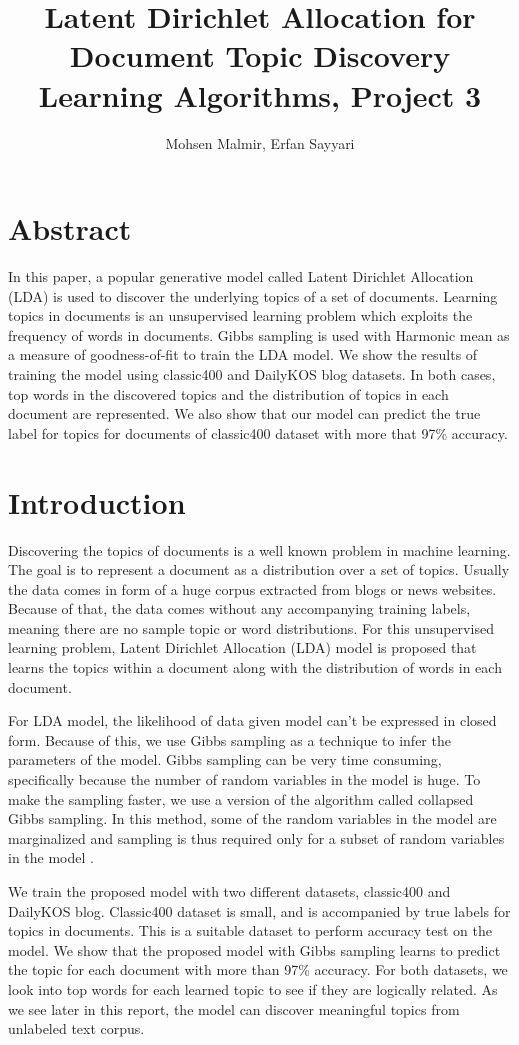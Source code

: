 \documentclass[twoside,12pt]{article}
\begin{document}
\title{Latent Dirichlet Allocation for Document Topic Discovery\\  Learning Algorithms, Project 3}
\author{Mohsen Malmir, Erfan Sayyari}
\maketitle

\section{Abstract}
In this paper, a popular generative model called Latent Dirichlet Allocation (LDA) is used to discover the underlying topics of  a set of documents. Learning topics in documents is an unsupervised learning problem which exploits the frequency of words in documents. Gibbs sampling is used with Harmonic mean as a measure of goodness-of-fit to train the LDA model. We show the results of training the model using classic400 and DailyKOS blog datasets. In both cases, top words in the discovered topics and the distribution of topics in each document are represented. We also show that our model can predict the true label for topics for documents of classic400 dataset with more that 97\% accuracy.

\section{Introduction}
\par{Discovering the topics of documents is a well known problem in machine learning. The goal is to represent a document as a distribution over a set of topics. Usually the data comes in form of a huge corpus extracted from blogs or news websites. Because of that, the data comes without any accompanying training labels, meaning there are no sample topic or word distributions. For this unsupervised learning problem, Latent Dirichlet Allocation (LDA) model is proposed that learns the topics within a document along with the distribution of words in each document.}
\par{For LDA model, the likelihood of data given model can't be expressed in closed form. Because of this, we use Gibbs sampling as a technique to infer the parameters of the model. Gibbs sampling can be very time consuming, specifically because the number of random variables in the model is huge. To make the sampling faster, we use a version of the algorithm called collapsed Gibbs sampling. In this method, some of the random variables in the model are marginalized and sampling is thus required only for a subset of random variables in the model .}
\par{We train the proposed model with two different datasets, classic400 and DailyKOS blog. Classic400 dataset is small, and is accompanied by true labels for topics in documents. This is a suitable dataset to perform accuracy test on the model. We show that the proposed model with Gibbs sampling learns to predict the topic for each document with more than 97\% accuracy. For both datasets, we look into top words for each learned topic to see if they are logically related. As we see later in this report, the model can discover meaningful topics from unlabeled text corpus.}
\end{document}
